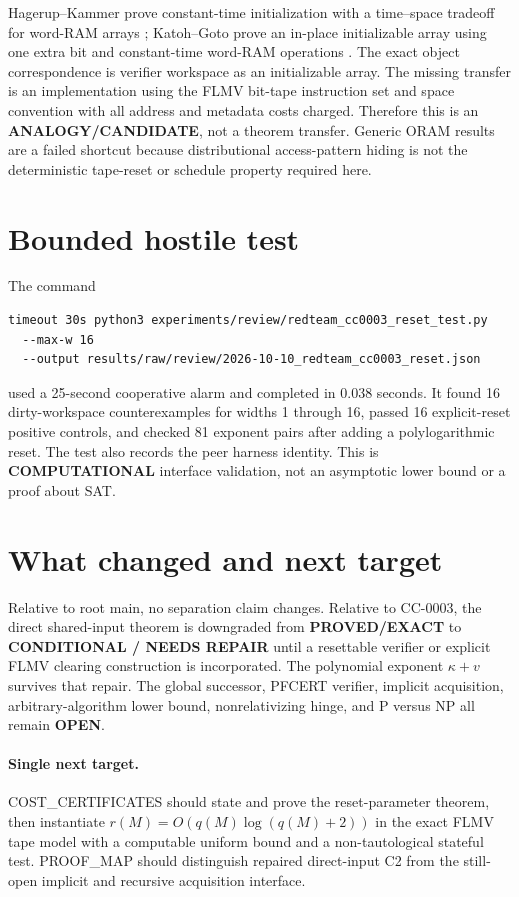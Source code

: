 \documentclass[11pt]{article}
\begin{document}
Hagerup--Kammer prove constant-time initialization with a time--space tradeoff
for word-RAM arrays \cite{hagerupkammer}; Katoh--Goto prove an in-place
initializable array using one extra bit and constant-time word-RAM operations
\cite{katohgoto}.  The exact object correspondence is verifier workspace as
an initializable array.  The missing transfer is an implementation using the
FLMV bit-tape instruction set and space convention with all address and
metadata costs charged.  Therefore this is an \textbf{ANALOGY/CANDIDATE},
not a theorem transfer.  Generic ORAM results are a failed shortcut because
distributional access-pattern hiding is not the deterministic tape-reset or
schedule property required here.

\section{Bounded hostile test}
The command
\begin{verbatim}
timeout 30s python3 experiments/review/redteam_cc0003_reset_test.py
  --max-w 16
  --output results/raw/review/2026-10-10_redteam_cc0003_reset.json
\end{verbatim}
used a 25-second cooperative alarm and completed in 0.038 seconds.  It found
16 dirty-workspace counterexamples for widths 1 through 16, passed 16
explicit-reset positive controls, and checked 81 exponent pairs after adding
a polylogarithmic reset.  The test also records the peer harness identity.
This is \textbf{COMPUTATIONAL} interface validation, not an asymptotic lower
bound or a proof about SAT.

\section{What changed and next target}
Relative to root main, no separation claim changes.  Relative to CC-0003,
the direct shared-input theorem is downgraded from \textbf{PROVED/EXACT} to
\textbf{CONDITIONAL / NEEDS REPAIR} until a resettable verifier or explicit
FLMV clearing construction is incorporated.  The polynomial exponent
$\kappa+v$ survives that repair.  The global successor, PFCERT verifier,
implicit acquisition, arbitrary-algorithm lower bound, nonrelativizing hinge,
and P versus NP all remain \textbf{OPEN}.

\paragraph{Single next target.}
COST\_CERTIFICATES should state and prove the reset-parameter theorem, then
instantiate $r(M)=O(q(M)\log(q(M)+2))$ in the exact FLMV tape model with a
computable uniform bound and a non-tautological stateful test.  PROOF\_MAP
should distinguish repaired direct-input C2 from the still-open implicit and
recursive acquisition interface.
\end{document}
